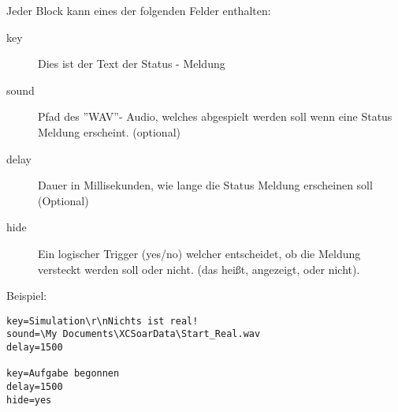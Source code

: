 Jeder Block kann eines der folgenden Felder enthalten:

\begin{description}
\item[key]  Dies ist der Text der Status - Meldung
\item[sound]  Pfad des ''\textsf{WAV}''- Audio, welches abgespielt werden soll
wenn eine Status Meldung erscheint. (optional)
\item[delay] Dauer in Millisekunden, wie lange die Status Meldung erscheinen soll (Optional)
\item[hide] Ein logischer Trigger (yes/no) welcher entscheidet, ob die Meldung
versteckt werden soll oder nicht. (das heißt, angezeigt, oder nicht).
\end{description}

Beispiel:
\begin{verbatim}
key=Simulation\r\nNichts ist real!
sound=\My Documents\XCSoarData\Start_Real.wav
delay=1500

key=Aufgabe begonnen
delay=1500
hide=yes
\end{verbatim}

